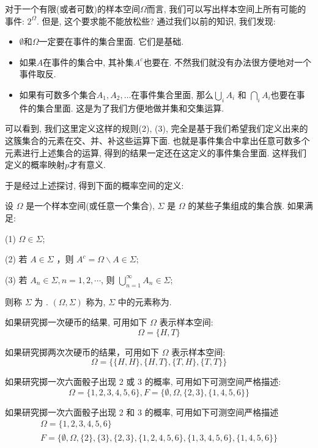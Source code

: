 \documentclass{ctexart}
\begin{document}
对于一个有限(或者可数)的样本空间$\Omega$而言, 我们可以写出样本空间上所有可能的事件: $2^\Omega$. 但是, 这个要求能不能放松些? 通过我们以前的知识, 我们发现: 
\begin{itemize}
    \item $\emptyset$和$\Omega$一定要在事件的集合里面. 它们是基础. 
    \item 如果$A$在事件的集合中, 其补集$A^c$也要在. 不然我们就没有办法很方便地对一个事件取反. 
    \item 如果有可数多个集合$A_1, A_2, \ldots$在事件集合里面, 那么$\bigcup_i A_i$ 和 $\bigcap_i A_i$也要在事件的集合里面. 这是为了我们方便地做并集和交集运算. 
\end{itemize} 

可以看到, 我们这里定义这样的规则(2), (3), 完全是基于我们希望我们定义出来的这簇集合的元素在交、并、补这些运算下面. 也就是事件集合中拿出任意可数多个元素进行上述集合的运算, 得到的结果一定还在这定义的事件集合里面. 这样我们定义的概率映射$p$才有意义. 

于是经过上述探讨, 得到下面的概率空间的定义: 

\begin{definition}
    设 $\Omega$ 是一个样本空间(或任意一个集合), $\Sigma$ 是 $\Omega$ 的某些子集组成的集合族. 如果满足:

(1) $\Omega \in \Sigma$;

(2) 若 $A \in \Sigma$ ，则 $A^{c}=\Omega \backslash A \in \Sigma$;

(3) 若 $A_{n} \in \Sigma, n=1,2, \cdots$, 则 $\bigcup_{n=1}^{\infty} A_{n} \in \Sigma$;

则称 $\Sigma$ 为 . $(\Omega, \Sigma)$ 称为, $\Sigma$ 中的元素称为.
\end{definition}

\begin{example}
    如果研究掷一次硬币的结果, 可用如下 $\Omega$ 表示样本空间:
$$
\Omega=\{H, T\}
$$

如果研究掷两次次硬币的结果，可用如下 $\Omega$ 表示样本空间:
$$
\Omega=\{\{H, H\},\{H, T\},\{T, H\},\{T, T\}\}
$$

如果研究掷一次六面骰子出现 2 或 3 的概率, 可用如下可测空间严格描述:
$$
\Omega=\{1,2,3,4,5,6\}, F=\{\emptyset, \Omega,\{2,3\},\{1,4,5,6\}\}
$$

如果研究掷一次六面骰子出现 2 和 3 的概率, 可用如下可测空间严格描述
$$
\begin{gathered}
\Omega=\{1,2,3,4,5,6\} \\
F=\{\emptyset, \Omega,\{2\},\{3\},\{2,3\},\{1,2,4,5,6\},\{1,3,4,5,6\},\{1,4,5,6\}\}
\end{gathered}
$$
\end{example}
\end{document}
